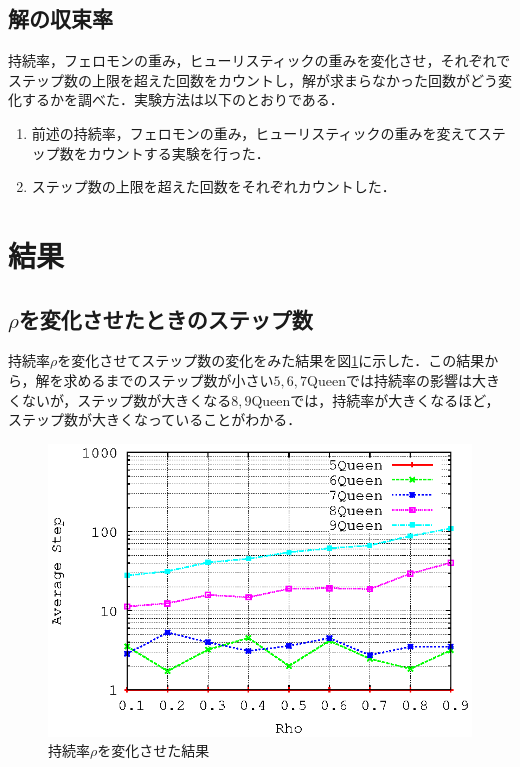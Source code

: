 \documentclass{jarticle}
\begin{document}
\subsection{解の収束率}
持続率，フェロモンの重み，ヒューリスティックの重みを変化させ，それぞれでステップ数の上限を超えた回数をカウントし，解が求まらなかった回数がどう変化するかを調べた．実験方法は以下のとおりである．
\begin{enumerate}
	\item 前述の持続率，フェロモンの重み，ヒューリスティックの重みを変えてステップ数をカウントする実験を行った．
	\item ステップ数の上限を超えた回数をそれぞれカウントした．
\end{enumerate}



\section{結果}

\subsection{$\rho$を変化させたときのステップ数}
持続率$\rho$を変化させてステップ数の変化をみた結果を図\ref{fig:rho}に示した．この結果から，解を求めるまでのステップ数が小さい$5,6,7$Queenでは持続率の影響は大きくないが，ステップ数が大きくなる$8,9$Queenでは，持続率が大きくなるほど，ステップ数が大きくなっていることがわかる．
\begin{figure}[H]
\begin{center}
	\includegraphics[width=120mm]{image/rho.eps}
	\caption{持続率$\rho$を変化させた結果}
	\label{fig:rho}
\end{center}
\end{figure}
\end{document}
